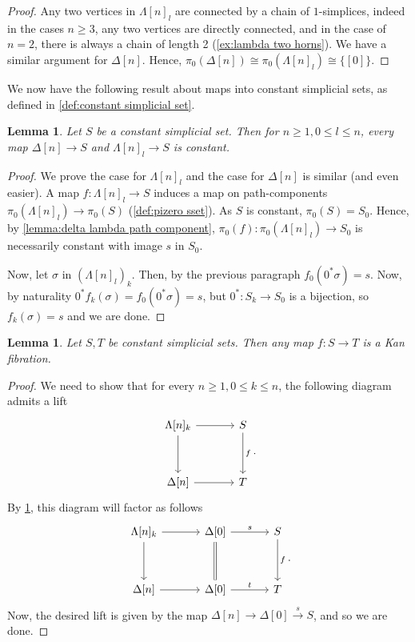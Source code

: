\documentclass[11pt, a4paper]{amsart}
\newtheorem{lemma}[equation]{Lemma}
\theoremstyle{definition}
\theoremstyle{remark}
\numberwithin{equation}{section}
\begin{document}
\begin{proof}
 Any two vertices in $\Lambda[n]_l$ are connected by a chain of $1$-simplices, indeed in the cases $n \geq 3$, any two vertices are directly connected, and in the case of $n = 2$, there is always a chain of length 2 (\cref{ex:lambda two horns}). We have a similar argument for $\Delta[n]$. Hence, $\pi_0(\Delta[n]) \cong \pi_0(\Lambda[n]_l) \cong \{[0]\}$.
\end{proof}

We now have the following result about maps into constant simplicial sets, as defined in \cref{def:constant simplicial set}.

\begin{lemma} \label{lemma:constant boundary sset}
 Let $S$ be a constant simplicial set. Then for $n \geq 1, 0 \leq l \leq n$, every map $\Delta[n] \to S$ and $\Lambda[n]_l \to S$ is constant.
\end{lemma}

\begin{proof}
  We prove the case for $\Lambda[n]_l$ and the case for $\Delta[n]$ is similar (and even easier). A map $f\colon \Lambda[n]_l \to S$ induces a map on path-components $\pi_0(\Lambda[n]_l) \to \pi_0(S)$ (\cref{def:pizero sset}). As $S$ is constant, $\pi_0(S) = S_0$. Hence, by \cref{lemma:delta lambda path component}, $\pi_0(f)\colon\pi_0(\Lambda[n]_l) \to S_0$ is necessarily constant with image $s$ in $S_0$. 

  Now, let $\sigma$ in $(\Lambda[n]_l)_k$. Then, by the previous paragraph $f_0(0^*\sigma) = s$. Now, by naturality $0^*f_k(\sigma) = f_0(0^*\sigma) = s$, but $0^*\colon S_k \to S_0$ is a bijection, so $f_k(\sigma) = s$ and we are done.
\end{proof}

\begin{lemma} \label{lemma:constant kan fibration}
  Let $S,T$ be constant simplicial sets. Then any map $f\colon S \to T$ is a Kan fibration.
\end{lemma}

\begin{proof}
 We need to show that for every $n \geq 1, 0 \leq k \leq n$, the following diagram admits a lift
  \[
    \begin{tikzcd}[row sep=1.2cm, column sep=1.2cm]
     \Lambda[n]_k  \arrow[r] \arrow[d] & S \arrow[d, "f"] \\ 
     \Delta[n]  \arrow[r] & T
    \end{tikzcd}.
  \]
  By \cref{lemma:constant boundary sset}, this diagram will factor as follows
  \[
    \begin{tikzcd}[row sep=1.2cm, column sep=1.2cm]
     \Lambda[n]_k  \arrow[r] \arrow[d] & \Delta[0] \arrow[d, equal] \arrow[r, "s"] & S \arrow[d, "f"] \\ 
     \Delta[n] \arrow[r] & \Delta[0] \arrow[r, "t"] & T
    \end{tikzcd}.
  \]
  Now, the desired lift is given by the map $\Delta[n] \to \Delta[0] \xrightarrow{s} S$, and so we are done.
\end{proof}
\end{document}
